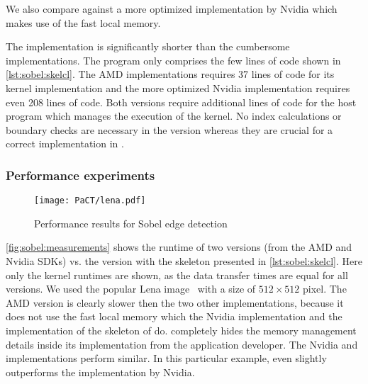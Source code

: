 We also compare against a more optimized \OpenCL implementation by Nvidia which makes use of the fast local \GPU memory.

The \SkelCL implementation is significantly shorter than the cumbersome \OpenCL implementations.
The \SkelCL program only comprises the few lines of code shown in \autoref{lst:sobel:skelcl}.
The AMD implementations requires 37 lines of code for its kernel implementation and the more optimized Nvidia implementation requires even 208 lines of code.
Both versions require additional lines of code for the host program which manages the execution of the \OpenCL kernel.
No index calculations or boundary checks are necessary in the \SkelCL version whereas they are crucial for a correct implementation in \OpenCL.

\subsubsection*{Performance experiments}

\begin{figure}[tbp]
  \vspace{.5em}
  \centering
  \texttt{[image: PaCT/lena.pdf]}
  \caption{Performance results for Sobel edge detection}
  \label{fig:sobel:measurements}
\end{figure}
\autoref{fig:sobel:measurements} shows the runtime of two \OpenCL versions (from the AMD and Nvidia SDKs) vs. the \SkelCL version with the \stencil skeleton presented in \autoref{lst:sobel:skelcl}.
Here only the kernel runtimes are shown, as the data transfer times are equal for all versions.
We used the popular Lena image~\cite{Lena} with a size of $512\times 512$ pixel.
The AMD version is clearly slower then the two other implementations, because it does not use the fast local memory which the Nvidia implementation and the  implementation of the \stencil skeleton of \SkelCL do.
\SkelCL completely hides the memory management details inside its implementation from the application developer.
The Nvidia and \SkelCL implementations perform similar.
In this particular example, \SkelCL even slightly outperforms the implementation by Nvidia.










